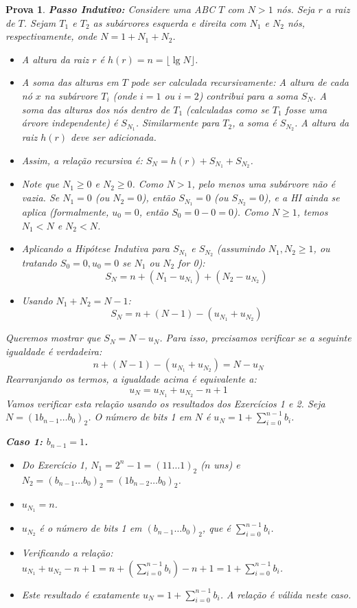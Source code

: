 \documentclass[11pt,reqno,a4paper]{amsart}
\theoremstyle{prova_style}
\newtheorem*{prova}{Prova} %
\DeclareMathOperator{\lgop}{lg}
\newcommand{\lgfn}[1]{\lgop #1}
\begin{document}
\begin{prova}
\textbf{Passo Indutivo:} Considere uma ABC $T$ com $N > 1$ nós. Seja $r$ a raiz de $T$. Sejam $T_1$ e $T_2$ as subárvores esquerda e direita com $N_1$ e $N_2$ nós, respectivamente, onde $N = 1 + N_1 + N_2$.
\begin{itemize}
    \item A altura da raiz $r$ é $h(r) = n = \lfloor \lgfn N \rfloor$.
    \item A soma das alturas em $T$ pode ser calculada recursivamente: A altura de cada nó $x$ na subárvore $T_i$ (onde $i=1$ ou $i=2$) contribui para a soma $S_N$. A soma das alturas dos nós dentro de $T_1$ (calculadas como se $T_1$ fosse uma árvore independente) é $S_{N_1}$. Similarmente para $T_2$, a soma é $S_{N_2}$. A altura da raiz $h(r)$ deve ser adicionada.
    \item Assim, a relação recursiva é: $S_N = h(r) + S_{N_1} + S_{N_2}$.
    \item Note que $N_1 \ge 0$ e $N_2 \ge 0$. Como $N > 1$, pelo menos uma subárvore não é vazia. Se $N_1=0$ (ou $N_2=0$), então $S_{N_1}=0$ (ou $S_{N_2}=0$), e a HI ainda se aplica (formalmente, $u_0=0$, então $S_0=0-0=0$). Como $N \ge 1$, temos $N_1 < N$ e $N_2 < N$.
    \item Aplicando a Hipótese Indutiva para $S_{N_1}$ e $S_{N_2}$ (assumindo $N_1, N_2 \ge 1$, ou tratando $S_0=0, u_0=0$ se $N_1$ ou $N_2$ for 0):
      \[ S_N = n + (N_1 - u_{N_1}) + (N_2 - u_{N_2}) \]
    \item Usando $N_1 + N_2 = N - 1$:
      \[ S_N = n + (N - 1) - (u_{N_1} + u_{N_2}) \]
\end{itemize}
Queremos mostrar que $S_N = N - u_N$. Para isso, precisamos verificar se a seguinte igualdade é verdadeira:
\[ n + (N - 1) - (u_{N_1} + u_{N_2}) = N - u_N \]
Rearranjando os termos, a igualdade acima é equivalente a:
\[ u_N = u_{N_1} + u_{N_2} - n + 1 \]
Vamos verificar esta relação usando os resultados dos Exercícios 1 e 2. Seja $N = (1 b_{n-1} \dots b_0)_2$. O número de bits 1 em $N$ é $u_N = 1 + \sum_{i=0}^{n-1} b_i$.

\textbf{Caso 1: $b_{n-1} = 1$.}
\begin{itemize}
    \item Do Exercício 1, $N_1 = 2^n - 1 = (11\dots1)_2$ ($n$ uns) e $N_2 = (b_{n-1} \dots b_0)_2 = (1 b_{n-2} \dots b_0)_2$.
    \item $u_{N_1} = n$.
    \item $u_{N_2}$ é o número de bits 1 em $(b_{n-1} \dots b_0)_2$, que é $\sum_{i=0}^{n-1} b_i$.
    \item Verificando a relação:
      $u_{N_1} + u_{N_2} - n + 1 = n + \left(\sum_{i=0}^{n-1} b_i\right) - n + 1 = 1 + \sum_{i=0}^{n-1} b_i$.
    \item Este resultado é exatamente $u_N = 1 + \sum_{i=0}^{n-1} b_i$. A relação é válida neste caso.
\end{itemize}


\end{prova}
\end{document}
